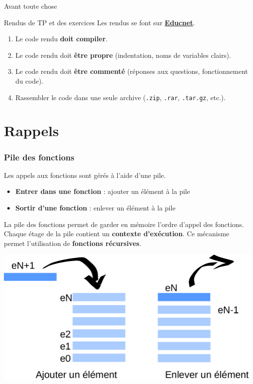 
\author[nicolas.audebert@onera.fr]{Nicolas Audebert}
\date[27 oct. 2017]{Vendredi 27 octobre 2017}
\maketitle

\begin{frame}{Avant toute chose}
  \begin{alertblock}{Rendus de TP et des exercices}
  Les rendus se font sur \href{https://educnet.enpc.fr}{\textbf{Educnet}}.
  \begin{enumerate}
  	\item Le code rendu \textbf{doit compiler}.
    \item Le code rendu doit \textbf{être propre} (indentation, noms de variables clairs).
    \item Le code rendu doit \textbf{être commenté} (réponses aux questions, fonctionnement du code).
    \item Rassembler le code dans une seule archive (\texttt{.zip}, \texttt{.rar}, \texttt{.tar.gz}, etc.).
  \end{enumerate}
  \end{alertblock}

\end{frame}

\section{Rappels}

\begin{frame}
	\frametitle{Pile des fonctions}
    Les appels aux fonctions sont gérés à l'aide d'une pile.
    \begin{itemize}
        \item \textbf{Entrer dans une fonction} : ajouter un élément à la pile
        \item \textbf{Sortir d'une fonction} : enlever un élément à la pile
    \end{itemize}
	La pile des fonctions permet de garder en mémoire l'ordre d'appel des fonctions. Chaque étage de la pile contient un \textbf{contexte d'exécution}. Ce mécanisme permet l'utilisation de \textbf{fonctions récursives}.
	
	    \begin{center}
	        \includegraphics[width=0.6\linewidth]{images/pile.pdf}
	    \end{center}
\end{frame}

